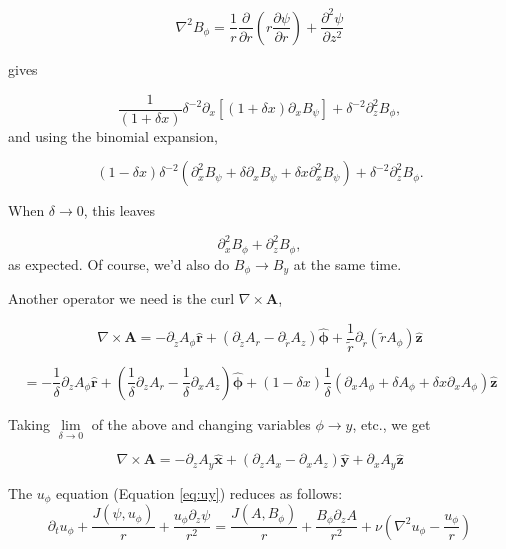 \documentclass{paper}
\newcommand{\beq}{\begin{equation}}
\newcommand{\eeq}{\end{equation}}
\newcommand{\uphi}{\ensuremath{u_\phi}}
\newcommand{\rhat}{\ensuremath{\mathbf{\hat{r}}}}
\newcommand{\phihat}{\ensuremath{\mathbf{\hat{\phi}}}}
\newcommand{\zhat}{\ensuremath{\mathbf{\hat{z}}}}
\newcommand{\xhat}{\ensuremath{\mathbf{\hat{x}}}}
\newcommand{\yhat}{\ensuremath{\mathbf{\hat{y}}}}
\begin{document}
\begin{equation}
  \nabla^2 B_\phi = \frac{1}{r} \frac{\partial}{\partial r}\left(r \frac{\partial \psi}{\partial r} \right) + \frac{\partial^2 \psi}{\partial z^2}
\end{equation}

gives

\begin{equation}
  \frac{1}{(1 + \delta x)} \delta^{-2} \partial_x \left[(1 + \delta x) \partial_x B_\psi \right] + \delta^{-2} \partial_z^2 B_\phi,
\end{equation}
and using the binomial expansion, 

\begin{equation}
  (1 - \delta x) \delta^{-2} \left(\partial_x^2 B_\psi + \delta \partial_x B_\psi + \delta x \partial_x^2 B_\psi \right) + \delta^{-2} \partial_z^2 B_\phi.
\end{equation}

When $\delta \to 0$, this leaves

\begin{equation}
  \partial_x^2 B_\phi + \partial_z^2 B_\phi,
\end{equation}
as expected. Of course, we'd also do $B_\phi \to B_y$ at the same time.

Another operator we need is the curl $\nabla \times \mathbf{A}$,

\beq
\nabla \times \mathbf{A} = -\partial_{\widetilde{z}} A_\phi \rhat + \left(\partial_{\widetilde{z}} A_r - \partial_{\widetilde{r}} A_z \right) \phihat + \frac{1}{\widetilde{r}} \partial_{\widetilde{r}} \left( \widetilde{r} A_\phi\right) \zhat
\eeq

\beq
= - \frac{1}{\delta} \partial_z A_\phi \rhat + \left(\frac{1}{\delta} \partial_z A_r - \frac{1}{\delta} \partial_x A_z\right) \phihat + \left(1 - \delta x\right) \frac{1}{\delta} \left(\partial_x A_\phi + \delta A_\phi + \delta x \partial_x A_\phi \right) \zhat
\eeq

Taking $\lim\limits_{\delta \to 0}$ of the above and changing variables $\phi \to y$, etc., we get

\beq
\nabla \times \mathbf{A} = -\partial_z A_y \xhat + \left(\partial_z A_x - \partial_x A_z\right) \yhat + \partial_x A_y \zhat
\eeq

The $u_\phi$ equation (Equation \ref{eq:uy}) reduces as follows:
\begin{equation}
\partial_t \uphi + \frac{J(\psi, \uphi)}{r} + \frac{\uphi \partial_z \psi}{r^2} = \frac{J(A, B_\phi)}{r} + \frac{B_\phi \partial_z A}{r^2} + \nu \left( \nabla^2 \uphi - \frac{\uphi}{r}\right)
\end{equation}
\end{document}

